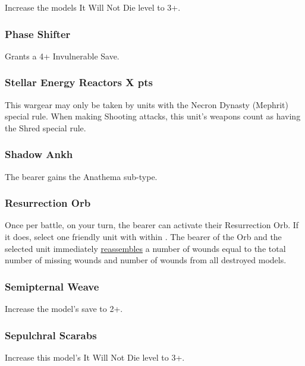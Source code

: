 Increase the models It Will Not Die level to 3+.

\subsubsection{Phase Shifter} \label{Phase Shifter}

Grants a 4+ Invulnerable Save.

\subsubsection[Stellar Energetics]{Stellar Energy Reactors \hrulefill X pts} \label{Stellar Energy Reactors}

This wargear may only be taken by units with the Necron Dynasty (Mephrit) special rule. When making Shooting attacks, this unit's weapons count as having the Shred special rule.

\subsubsection{Shadow Ankh} \label{Shadow Ankh}

The bearer gains the Anathema sub-type.

\subsubsection{Resurrection Orb} \label{Resurrection Orb}

Once per battle, on your turn, the bearer can activate their Resurrection Orb. If it does, select one friendly unit with  within . The bearer of the Orb and the selected unit immediately \textcolor{violet}{\hyperref[Reanimation Protocols]{reassembles}} a number of wounds equal to the total number of missing wounds and number of wounds from all destroyed models.

\subsubsection{Semipternal Weave} \label{Sempiternal Weave}

Increase the model's save to 2+.

\subsubsection{Sepulchral Scarabs} \label{Sepulchral Scarabs}

Increase this model's It Will Not Die level to 3+.

